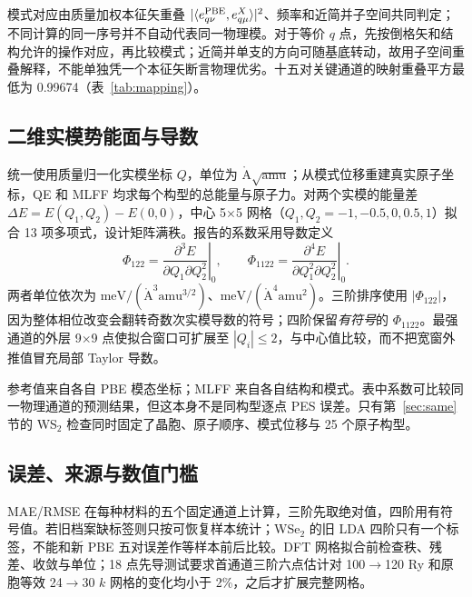 \documentclass[UTF8,a4paper,11pt,fontset=mac]{ctexart}
\newcommand{\PhiC}{\Phi_{122}}
\newcommand{\PhiD}{\Phi_{1122}}
\newcommand{\Qunit}{\mathring{\mathrm A}\sqrt{\mathrm{amu}}}
\newcommand{\cubunit}{\mathrm{meV}/(\mathring{\mathrm A}^{3}\mathrm{amu}^{3/2})}
\newcommand{\quartunit}{\mathrm{meV}/(\mathring{\mathrm A}^{4}\mathrm{amu}^{2})}
\newcommand{\allwidthtable}[1]{\resizebox{\textwidth}{!}{}}
\begin{document}
\begin{table}[!htbp]\centering\small\caption{三种材料的自行弛豫面内晶格常数 $a$（Å）与 PBE 相对旧 LDA 的变化；E3 为 EquiformerV3。}\label{tab:geometry}
\end{table}

模式对应由质量加权本征矢重叠 $|\langle e^{\rm PBE}_{q\nu},e^{X}_{q\mu}\rangle|^2$、频率和近简并子空间共同判定；不同计算的同一序号并不自动代表同一物理模。对于等价 $q$ 点，先按倒格矢和结构允许的操作对应，再比较模式；近简并单支的方向可随基底转动，故用子空间重叠解释，不能单独凭一个本征矢断言物理优劣。十五对关键通道的映射重叠平方最低为 0.99674（表~\ref{tab:mapping}）。

\begin{table}[!htbp]\centering\small
\caption{十五个固定物理通道的 PBE 频率与旧 LDA 至 PBE 的模式重叠。频率单位 THz。}\label{tab:mapping}
\allwidthtable{mode_mapping}
\end{table}

\subsection{二维实模势能面与导数}

统一使用质量归一化实模坐标 $Q$，单位为 $\Qunit$；从模式位移重建真实原子坐标，QE 和 MLFF 均求每个构型的总能量与原子力。对两个实模的能量差 $\Delta E=E(Q_1,Q_2)-E(0,0)$，中心 5$\times$5 网格（$Q_1,Q_2=-1,-0.5,0,0.5,1$）拟合 13 项多项式，设计矩阵满秩。报告的系数采用导数定义
\begin{equation}
\PhiC=\left.\frac{\partial^3 E}{\partial Q_1\partial Q_2^2}\right|_0,
\qquad
\PhiD=\left.\frac{\partial^4 E}{\partial Q_1^2\partial Q_2^2}\right|_0.
\label{eq:derivative}
\end{equation}
两者单位依次为 $\cubunit$、$\quartunit$。三阶排序使用 $|\PhiC|$，因为整体相位改变会翻转奇数次实模导数的符号；四阶保留\emph{有符号}的 $\PhiD$。最强通道的外层 9$\times$9 点使拟合窗口可扩展至 $|Q_i|\leq2$，与中心值比较，而不把宽窗外推值冒充局部 Taylor 导数。

参考值来自各自 PBE 模态坐标；MLFF 来自各自结构和模式。表中系数可比较同一物理通道的预测结果，但这本身不是同构型逐点 PES 误差。只有第~\ref{sec:same} 节的 WS$_2$ 检查同时固定了晶胞、原子顺序、模式位移与 25 个原子构型。

\subsection{误差、来源与数值门槛}

MAE/RMSE 在每种材料的五个固定通道上计算，三阶先取绝对值，四阶用有符号值。若旧档案缺标签则只按可恢复样本统计；WSe$_2$ 的旧 LDA 四阶只有一个标签，不能和新 PBE 五对误差作等样本前后比较。DFT 网格拟合前检查秩、残差、收敛与单位；18 点先导测试要求首通道三阶六点估计对 100$\to$120 Ry 和原胞等效 24$\to$30 $k$ 网格的变化均小于 2\%，之后才扩展完整网格。
\end{document}
